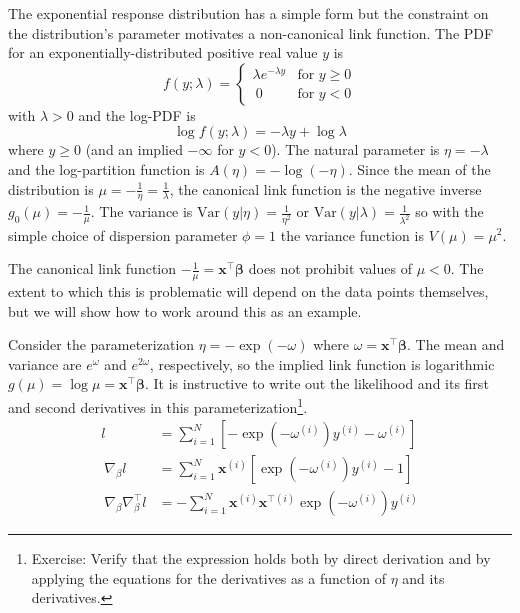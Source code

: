 \documentclass{article}
\newcommand{\bbeta}{\boldsymbol{\beta}}
\begin{document}
The exponential response distribution has a simple form but the constraint on
the distribution's parameter motivates a non-canonical link function. The PDF
for an exponentially-distributed positive real value \(y\) is
\[ f(y; \lambda) = \begin{cases}
\lambda e^{-\lambda y} & \textrm{for } y \geq 0 \\\
0 & \textrm{for } y < 0
\end{cases}\]
with \(\lambda > 0\) and the log-PDF is
\[ \log f(y; \lambda) = -\lambda y + \log \lambda \]
where \(y \geq 0\) (and an implied \(-\infty\) for \(y < 0\)). The natural
parameter is \(\eta = -\lambda\) and the log-partition function is \(A(\eta) =
- \log(-\eta)\).
Since the mean of the distribution is \(\mu = -\frac{1}{\eta} =
\frac{1}{\lambda}\), the canonical link function is the negative inverse
\(g_0(\mu) = -\frac{1}{\mu}\).
The variance is \(\textrm{Var}(y|\eta) = \frac{1}{\eta^2} \) or
\(\textrm{Var}(y|\lambda) = \frac{1}{\lambda^2} \) so with the simple choice
of dispersion parameter \(\phi = 1\) the variance function is \(V(\mu) =
\mu^2\).

The canonical link function \(-\frac{1}{\mu} = \mathbf{x}^\intercal
\bbeta\) does not prohibit values of \(\mu < 0\). The extent to
which this is problematic will depend on the data points themselves, but we will
show how to work around this as an example.

Consider the parameterization \(\eta = -\exp(-\omega)\) where \(
\omega = \mathbf{x}^\intercal \bbeta\).
The mean and variance are \(e^{\omega}\) and \(e^{2\omega}\), respectively,
so the implied link function is logarithmic \(g(\mu) = \log \mu =
\mathbf{x}^\intercal \bbeta \).
It is instructive to write out the likelihood and its first and second
derivatives in this parameterization\footnote{
    Exercise: Verify that the expression holds both by direct derivation and by applying
    the equations for the derivatives as a function of \(\eta\) and its derivatives.
}.
\begin{align}
l &= \sum_{i=1}^N \left[ - \exp\left(-\omega^{(i)}\right) y^{(i)} - \omega^{(i)} \right]\\\
\nabla_{\beta} l &= \sum_{i=1}^N \mathbf{x}^{(i)} \left[ \exp\left(-\omega^{(i)}\right) y^{(i)} - 1 \right] \\\
\nabla_{\beta} \nabla^\intercal_{\beta} l &= - \sum_{i=1}^N \mathbf{x}^{(i)}
\mathbf{x}^{\intercal(i)} \exp\left(-\omega^{(i)}\right) y^{(i)}
\end{align}
\end{document}
